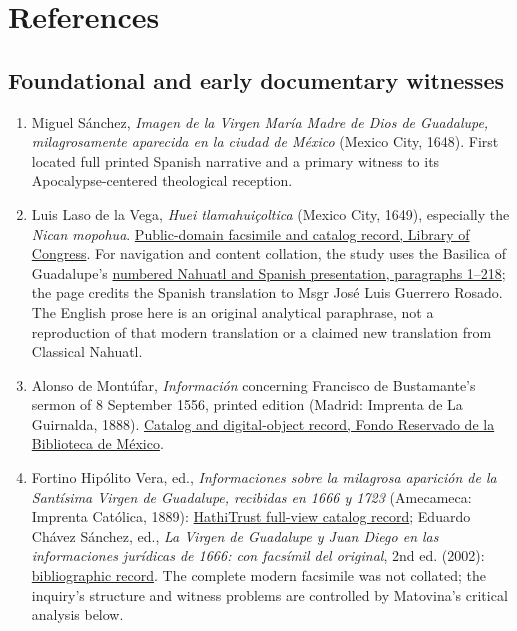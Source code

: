 \section{References}

\begingroup
\footnotesize
\linespread{0.98}\selectfont
\setlength{\parskip}{0pt}

\subsection{Foundational and early documentary witnesses}

\begin{enumerate}
  \item Miguel Sánchez, \emph{Imagen de la Virgen María Madre de Dios de Guadalupe, milagrosamente aparecida en la ciudad de México} (Mexico City, 1648). First located full printed Spanish narrative and a primary witness to its Apocalypse-centered theological reception.

  \item Luis Laso de la Vega, \emph{Huei tlamahuiçoltica} (Mexico City, 1649), especially the \emph{Nican mopohua}. \href{https://www.loc.gov/item/2021666123/}{Public-domain facsimile and catalog record, Library of Congress}. For navigation and content collation, the study uses the Basilica of Guadalupe's \href{https://virgendeguadalupe.org.mx/el-relato/}{numbered Nahuatl and Spanish presentation, paragraphs 1--218}; the page credits the Spanish translation to Msgr José Luis Guerrero Rosado. The English prose here is an original analytical paraphrase, not a reproduction of that modern translation or a claimed new translation from Classical Nahuatl.

  \item Alonso de Montúfar, \emph{Información} concerning Francisco de Bustamante's sermon of 8 September 1556, printed edition (Madrid: Imprenta de La Guirnalda, 1888). \href{https://bibliotecamexico-fondoreservado.cultura.gob.mx/fondo-reservado/informacion-que-el-arzobispo-de-mexico-d-fray-alonso-de-montufar-mando-a-practicar-con-motivo-de-un-sermon-que-en-la-fiesta-de-la-natividad-de-nuestra-senora-8-de-septiembre-de-1556-predico-en-la-c/}{Catalog and digital-object record, Fondo Reservado de la Biblioteca de México}.

  \item Fortino Hipólito Vera, ed., \emph{Informaciones sobre la milagrosa aparición de la Santísima Virgen de Guadalupe, recibidas en 1666 y 1723} (Amecameca: Imprenta Católica, 1889): \href{https://catalog.hathitrust.org/Record/008398996}{HathiTrust full-view catalog record}; Eduardo Chávez Sánchez, ed., \emph{La Virgen de Guadalupe y Juan Diego en las informaciones jurídicas de 1666: con facsímil del original}, 2nd ed. (2002): \href{https://books.google.com/books/about/La_Virgen_de_Guadalupe_y_Juan_Diego_en_l.html?id=KZRBHQAACAAJ}{bibliographic record}. The complete modern facsimile was not collated; the inquiry's structure and witness problems are controlled by Matovina's critical analysis below.


\end{enumerate}
